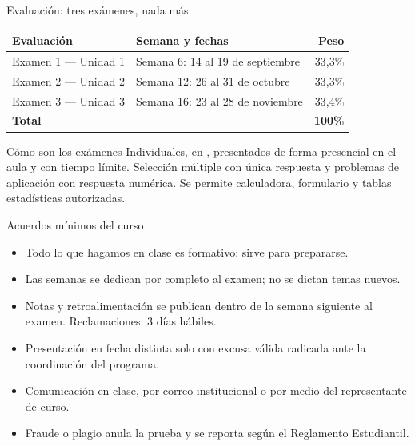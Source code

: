 \documentclass[aspectratio=169,10pt]{beamer}
\begin{document}
\begin{frame}{Evaluación: tres exámenes, nada más}
  \begin{center}
  \begin{tabular}{@{}llr@{}}
    \toprule
    \textbf{Evaluación} & \textbf{Semana y fechas} & \textbf{Peso} \\
    \midrule
    Examen 1 — Unidad 1 & Semana 6: 14 al 19 de septiembre  & 33,3\% \\
    Examen 2 — Unidad 2 & Semana 12: 26 al 31 de octubre    & 33,3\% \\
    Examen 3 — Unidad 3 & Semana 16: 23 al 28 de noviembre  & 33,4\% \\
    \midrule
    \textbf{Total}      &                                   & \textbf{100\%} \\
    \bottomrule
  \end{tabular}
  \end{center}

  \vspace{0.3cm}
  \begin{alertblock}{Cómo son los exámenes}
    \footnotesize
    Individuales, en , presentados de forma
    presencial en el aula y con tiempo límite. Selección múltiple con única
    respuesta y problemas de aplicación con respuesta numérica. Se permite
    calculadora, formulario y tablas estadísticas autorizadas.
  \end{alertblock}
\end{frame}

\begin{frame}{Acuerdos mínimos del curso}
  \begin{itemize}
    \item {} Todo lo que
          hagamos en clase es formativo: sirve para prepararse.
    \item Las semanas  se dedican por completo al examen;
          no se dictan temas nuevos.
    \item Notas y retroalimentación se publican dentro de la semana siguiente
          al examen. Reclamaciones: 3 días hábiles.
    \item Presentación en fecha distinta solo con excusa válida radicada ante
          la coordinación del programa.
    \item Comunicación en clase, por correo institucional o por medio del
          representante de curso.
    \item Fraude o plagio anula la prueba y se reporta según el Reglamento
          Estudiantil.
  \end{itemize}
\end{frame}
\end{document}
